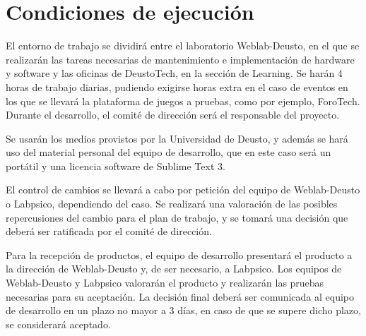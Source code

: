 \chapter{Condiciones de ejecución}

El entorno de trabajo se dividirá entre el laboratorio Weblab-Deusto, en el que se realizarán las
tareas necesarias de mantenimiento e implementación de hardware y software y las oficinas de
DeustoTech, en la sección de Learning. Se harán 4 horas de trabajo diarias, pudiendo exigirse horas
extra en el caso de eventos en los que se llevará la plataforma de juegos a pruebas, como por
ejemplo, ForoTech. Durante el desarrollo, el comité de dirección será el responsable del proyecto.

Se usarán los medios provistos por la Universidad de Deusto, y además se hará uso del material
personal del equipo de desarrollo, que en este caso será un portátil y una licencia software de
Sublime Text 3.

El control de cambios se llevará a cabo por petición del equipo de Weblab-Deusto o Labpsico,
dependiendo del caso. Se realizará una valoración de las posibles repercusiones del cambio para el
plan de trabajo, y se tomará una decisión que deberá ser ratificada por el comité de dirección.

Para la recepción de productos, el equipo de desarrollo presentará el producto a la dirección de
Weblab-Deusto y, de ser necesario, a Labpsico. Los equipos de Weblab-Deusto y Labpsico valorarán el
producto y realizarán las pruebas necesarias para su aceptación. La decisión final deberá ser
comunicada al equipo de desarrollo en un plazo no mayor a 3 días, en caso de que se supere dicho
plazo, se considerará aceptado.

